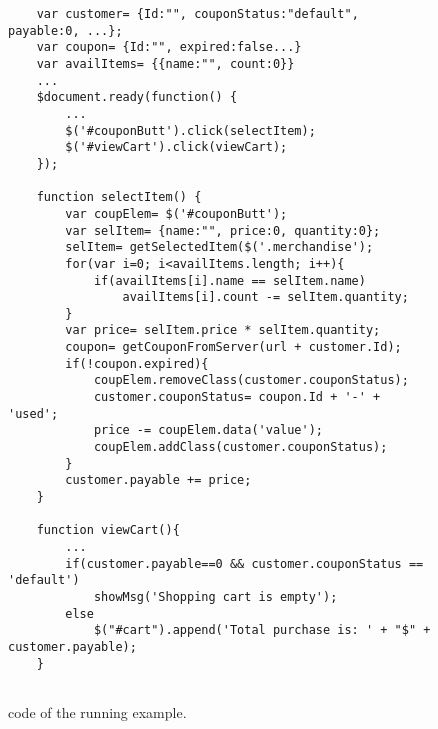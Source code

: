 \begin{figure}
\begin{lstlisting}
	var customer= {Id:"", couponStatus:"default", payable:0, ...};
	var coupon= {Id:"", expired:false...}
	var availItems= {{name:"", count:0}}
	...
	$document.ready(function() {
		...	
		$('#couponButt').click(selectItem);
		$('#viewCart').click(viewCart);
	});
	
	function selectItem() {
		var coupElem= $('#couponButt');
		var selItem= {name:"", price:0, quantity:0};
		selItem= getSelectedItem($('.merchandise');
		for(var i=0; i<availItems.length; i++){
			if(availItems[i].name == selItem.name)
				availItems[i].count -= selItem.quantity;		
		}
		var price= selItem.price * selItem.quantity;
		coupon= getCouponFromServer(url + customer.Id);
		if(!coupon.expired){
			coupElem.removeClass(customer.couponStatus);
			customer.couponStatus= coupon.Id + '-' + 'used';
			price -= coupElem.data('value');	
			coupElem.addClass(customer.couponStatus);	
		} 	
		customer.payable += price;
	}

	function viewCart(){
		...
		if(customer.payable==0 && customer.couponStatus == 'default')
			showMsg('Shopping cart is empty');
		else
			$("#cart").append('Total purchase is: ' + "$" + customer.payable);
	}


\end{lstlisting}
\vspace{-0.1in} 

\caption{\javascript code of the running example.}
\label{Fig:example}
\vspace{-0.2in} 

\end{figure}